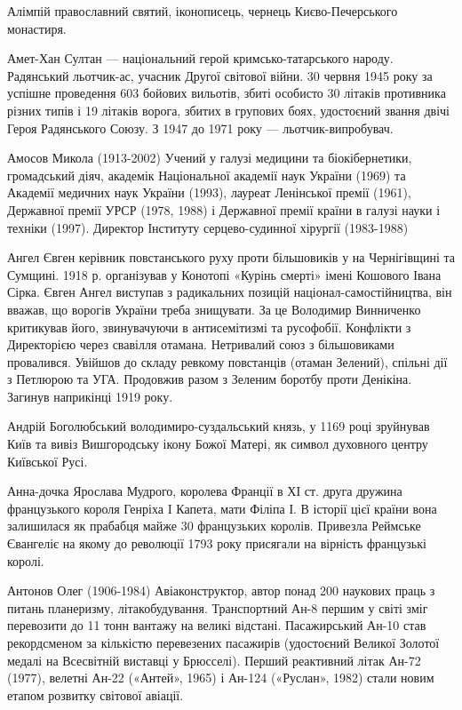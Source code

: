 Алімпій православний святий, іконописець, чернець Києво-Печерського монастиря.

Амет-Хан Султан --- національний герой кримсько-татарського народу. Радянський льотчик-ас, учасник Другої світової війни. 30 червня 1945 року за успішне проведення 603 бойових вильотів, збиті особисто 30 літаків противника різних типів і 19 літаків ворога, збитих в групових боях, удостоєний звання двічі Героя Радянського Союзу. З 1947 до 1971 року --- льотчик-випробувач.

Амосов Микола (1913-2002) Учений у галузі медицини та біокібернетики, громадський діяч, академік Національної академії наук України (1969) та Академії медичних наук України (1993), лауреат Ленінської премії (1961), Державної премії УРСР (1978, 1988) і Державної премії країни в галузі науки і техніки (1997). Директор Інституту серцево-судинної хірургії (1983-1988)

Ангел Євген керівник повстанського руху проти більшовиків у  на Чернігівщині та Сумщині. 1918 р. організував у Конотопі «Курінь смерті» імені Кошового Івана Сірка. Євген Ангел виступав з радикальних позицій націонал-самостійництва, він вважав, що ворогів України треба знищувати. За це Володимир Винниченко критикував його, звинувачуючи в антисемітизмі та русофобії.  Конфлікти з Директорією через свавілля отамана. Нетривалий союз з більшовиками провалився. Увійшов до складу ревкому повстанців (отаман Зелений), спільні дії з Петлюрою та УГА. Продовжив разом з Зеленим боротбу проти Денікіна. Загинув наприкінці 1919 року. 

Андрій Боголюбський володимиро-суздальський князь, у 1169 році зруйнував Київ та вивіз Вишгородську ікону Божої Матері, як символ духовного центру Київської Русі.

Анна-дочка Ярослава Мудрого, королева Франції в ХІ ст. друга дружина французького короля Генріха I Капета, мати Філіпа І. В історії цієї країни вона залишилася як прабабця майже 30 французьких королів. Привезла Реймське Євангеліє на якому до революції 1793 року присягали на вірність французькі королі.

Антонов Олег (1906-1984) Авіаконструктор, автор понад 200 наукових праць з питань планеризму, літакобудування. Транспортний Ан-8 першим у світі зміг перевозити до 11 тонн вантажу на великі відстані. Пасажирський Ан-10 став рекордсменом за кількістю перевезених пасажирів (удостоєний Великої Золотої медалі на Всесвітній виставці у Брюсселі). Перший реактивний літак Ан-72 (1977), велетні Ан-22 («Антей», 1965) і Ан-124 («Руслан», 1982) стали новим етапом розвитку світової авіації.

